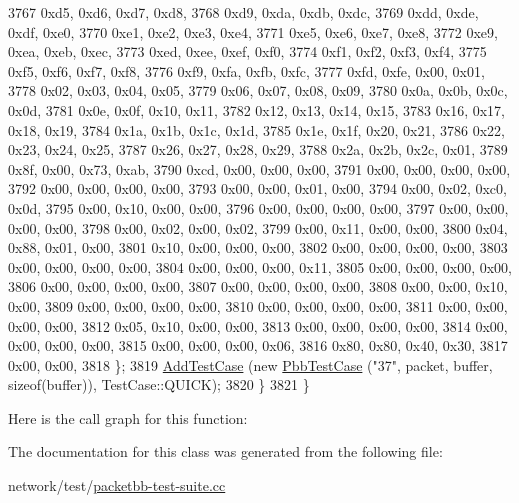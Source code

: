 \begin{DoxyCode}
3767       0xd5, 0xd6, 0xd7, 0xd8,
3768       0xd9, 0xda, 0xdb, 0xdc,
3769       0xdd, 0xde, 0xdf, 0xe0,
3770       0xe1, 0xe2, 0xe3, 0xe4,
3771       0xe5, 0xe6, 0xe7, 0xe8,
3772       0xe9, 0xea, 0xeb, 0xec,
3773       0xed, 0xee, 0xef, 0xf0,
3774       0xf1, 0xf2, 0xf3, 0xf4,
3775       0xf5, 0xf6, 0xf7, 0xf8,
3776       0xf9, 0xfa, 0xfb, 0xfc,
3777       0xfd, 0xfe, 0x00, 0x01,
3778       0x02, 0x03, 0x04, 0x05,
3779       0x06, 0x07, 0x08, 0x09,
3780       0x0a, 0x0b, 0x0c, 0x0d,
3781       0x0e, 0x0f, 0x10, 0x11,
3782       0x12, 0x13, 0x14, 0x15,
3783       0x16, 0x17, 0x18, 0x19,
3784       0x1a, 0x1b, 0x1c, 0x1d,
3785       0x1e, 0x1f, 0x20, 0x21,
3786       0x22, 0x23, 0x24, 0x25,
3787       0x26, 0x27, 0x28, 0x29,
3788       0x2a, 0x2b, 0x2c, 0x01,
3789       0x8f, 0x00, 0x73, 0xab,
3790       0xcd, 0x00, 0x00, 0x00,
3791       0x00, 0x00, 0x00, 0x00,
3792       0x00, 0x00, 0x00, 0x00,
3793       0x00, 0x00, 0x01, 0x00,
3794       0x00, 0x02, 0xc0, 0x0d,
3795       0x00, 0x10, 0x00, 0x00,
3796       0x00, 0x00, 0x00, 0x00,
3797       0x00, 0x00, 0x00, 0x00,
3798       0x00, 0x02, 0x00, 0x02,
3799       0x00, 0x11, 0x00, 0x00,
3800       0x04, 0x88, 0x01, 0x00,
3801       0x10, 0x00, 0x00, 0x00,
3802       0x00, 0x00, 0x00, 0x00,
3803       0x00, 0x00, 0x00, 0x00,
3804       0x00, 0x00, 0x00, 0x11,
3805       0x00, 0x00, 0x00, 0x00,
3806       0x00, 0x00, 0x00, 0x00,
3807       0x00, 0x00, 0x00, 0x00,
3808       0x00, 0x00, 0x10, 0x00,
3809       0x00, 0x00, 0x00, 0x00,
3810       0x00, 0x00, 0x00, 0x00,
3811       0x00, 0x00, 0x00, 0x00,
3812       0x05, 0x10, 0x00, 0x00,
3813       0x00, 0x00, 0x00, 0x00,
3814       0x00, 0x00, 0x00, 0x00,
3815       0x00, 0x00, 0x00, 0x06,
3816       0x80, 0x80, 0x40, 0x30,
3817       0x00, 0x00,
3818     \};
3819     \hyperlink{classns3_1_1TestCase_a3718088e3eefd5d6454569d2e0ddd835}{AddTestCase} (\textcolor{keyword}{new} \hyperlink{classPbbTestCase}{PbbTestCase} (\textcolor{stringliteral}{"37"}, packet, buffer, \textcolor{keyword}{sizeof}(buffer)), 
      TestCase::QUICK);
3820   \}
3821 \}
\end{DoxyCode}


Here is the call graph for this function\+:




The documentation for this class was generated from the following file\+:\begin{DoxyCompactItemize}
\item 
network/test/\hyperlink{packetbb-test-suite_8cc}{packetbb-\/test-\/suite.\+cc}\end{DoxyCompactItemize}
